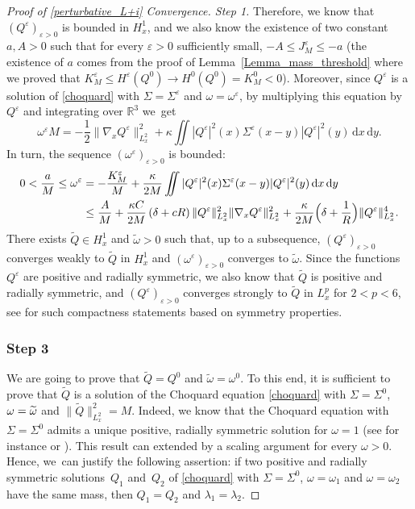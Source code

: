 \documentclass[11pt]{article}
\theoremstyle{definition}
\newenvironment{ProofOf}[1]{\begin{proof}[Proof of #1]}{\end{proof}}
\newcommand{\R}{\mathbb{R}}
\newcommand{\ud}{\, {\mathrm{d}}}
\begin{document}
\begin{ProofOf}{\eqref{perturbative_L+i} Convergence. Step 1}
Therefore, we know that $(Q^{\varepsilon})_{\varepsilon>0}$ is bounded in $H_{x}^{1}$, and we also know the existence of two constant $a,A>0$ such that for every $\varepsilon>0$ sufficiently small, \hbox{$-A\leq J_{M}^{\varepsilon}\leq -a$} (the existence of $a$ comes from the proof of Lemma~\ref{Lemma_mass_threshold} where we proved that \hbox{$K_{M}^{\varepsilon}\leq H^{\varepsilon}(Q^{0})\to H^{0}(Q^{0})=K_{M}^{0}<0$}). Moreover, since $Q^{\varepsilon}$ is a solution of \eqref{choquard} with $\Sigma=\Sigma^{\varepsilon}$ and $\omega=\omega^{\varepsilon}$, by multiplying this equation by $Q^{\varepsilon}$ and integrating over $\R^{3}$ we~get
\[
\omega^{\varepsilon}M=-\frac{1}{2}\|\nabla_{x}Q^{\varepsilon}\|_{L_{x}^{2}}^{2}+\kappa\iint|Q^{\varepsilon}|^{2}(x)\Sigma^{\varepsilon}(x-y)|Q^{\varepsilon}|^{2}(y)\ud x\ud y.
\]
In turn, the sequence $(\omega^{\varepsilon})_{\varepsilon>0}$ is bounded:
\begin{align*}
0<\frac{a}{M}\leq\omega^{\varepsilon}&=-\frac{K_{M}^{\varepsilon}}{M}+\frac{\kappa}{2M}\iint|Q^{\varepsilon}|^{2}(x)\Sigma^{\varepsilon}(x-y)|Q^{\varepsilon}|^{2}(y)\ud x\ud y\\
&\leq\frac{A}{M}+\frac{\kappa C}{2M}\left(\delta+cR\right)\|Q^{\varepsilon}\|_{L_{x}^{2}}^{2}\|\nabla_{x}Q^{\varepsilon}\|_{L_{x}^{2}}^{2}+\frac{\kappa}{2M}\Bigl(\delta+\frac{1}{R} \Bigr)\|Q^{\varepsilon}\|_{L_{x}^{2}}^{4}.
\end{align*}
There exists $\widetilde{Q}\in H_{x}^{1}$ and $\widetilde{\omega}>0$ such that, up to a subsequence, $(Q^{\varepsilon})_{\varepsilon>0}$ converges weakly to $\widetilde{Q}$ in $H_{x}^{1}$ and $(\omega^{\varepsilon})_{\varepsilon>0}$ converges to $\widetilde{\omega}$. Since the functions $Q^{\varepsilon}$ are positive and radially symmetric,
we also know that $\widetilde{Q}$ is positive and radially symmetric, and $(Q^{\varepsilon})_{\varepsilon>0}$ converges strongly to $\widetilde{Q}$ in $L_{x}^{p}$ for $2<p<6$,
see \cite{Pllsc,Strauss} for such compactness statements based on symmetry properties.

\subsubsection*{Step 3} We are going to prove that $\widetilde{Q}=Q^{0}$ and $\widetilde{\omega}=\omega^{0}$. To this end, it is sufficient to prove that $\widetilde{Q}$ is a solution of the Choquard equation \eqref{choquard} with $\Sigma=\Sigma^{0}$, $\omega=\nobreak\widetilde{\omega}$ and $\|\widetilde{Q}\|_{L_{x}^{2}}^{2}=M$. Indeed, we know that the Choquard equation with $\Sigma=\Sigma^{0}$ admits a unique positive, radially symmetric solution for $\omega=1$ (see for instance \cite{Lieb_Choquard} or \cite[App.\,A]{Lenzmann}).
This result can extended by a scaling argument for every $\omega>0$.
Hence, we~can justify the following assertion: if two positive and radially symmetric solutions~$Q_{1}$ and~$Q_{2}$ of \eqref{choquard} with $\Sigma=\Sigma^{0}$, $\omega=\omega_{1}$ and $\omega=\omega_{2}$ have the same mass, then $Q_{1}=Q_{2}$ and $\lambda_{1}=\lambda_{2}$.


\end{ProofOf}
\end{document}
